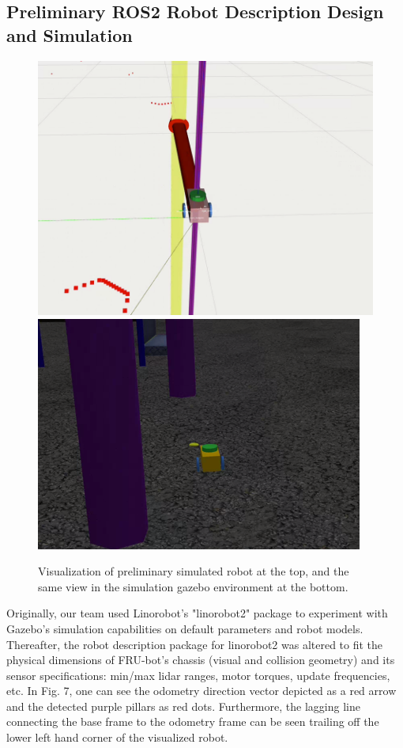 \documentclass[conference]{IEEEtran}
\begin{document}
\subsection{Preliminary ROS2 Robot Description Design and Simulation}
\begin{figure}
	\includegraphics[width=\linewidth]{./figs/rviz_sim.png}
	\vspace{2mm}
	\includegraphics[width=\linewidth]{./figs/gazebo_sim.png}
	\caption{Visualization of preliminary simulated robot at the top, and the same view in the simulation gazebo environment at the bottom.}
\end{figure}
Originally, our team used Linorobot's "linorobot2" package to experiment with Gazebo's simulation capabilities on default parameters and robot models. Thereafter, the robot description package for linorobot2 was altered to fit the physical dimensions of FRU-bot's chassis (visual and collision geometry) and its sensor specifications: min/max lidar ranges, motor torques, update frequencies, etc. In Fig. 7, one can see the odometry direction vector depicted as a red arrow and the detected purple pillars as red dots. Furthermore, the lagging line connecting the base frame to the odometry frame can be seen trailing off the lower left hand corner of the visualized robot.
\end{document}
